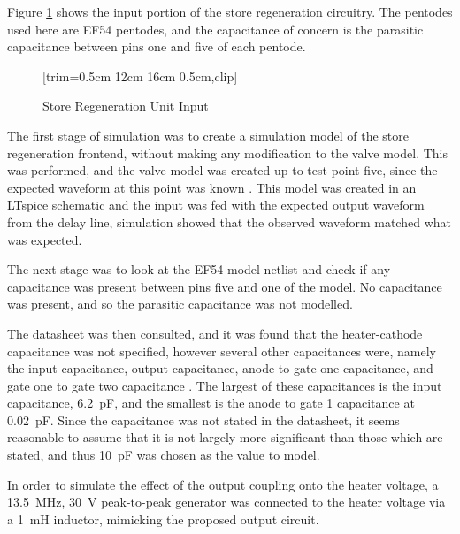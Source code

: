 Figure \ref{fig:store-regen-input} shows the input portion of the store regeneration circuitry. The pentodes used here are EF54 pentodes, and the capacitance of concern is the parasitic capacitance between pins one and five of each pentode.

\begin{figure}[ht]
	\centering
	[trim={0.5cm 12cm 16cm 0.5cm},clip] %
	\caption{Store Regeneration Unit Input \cite{burton2014b}}
	\label{fig:store-regen-input}
\end{figure}

The first stage of simulation was to create a simulation model of the store regeneration frontend, without making any modification to the valve model. This was performed, and the valve model was created up to test point five, since the expected waveform at this point was known \cite[p.3]{linnington2016b}. This model was created in an LTspice schematic and the input was fed with the expected output waveform from the delay line, simulation showed that the observed waveform matched what was expected.

The next stage was to look at the EF54 model netlist and check if any capacitance was present between pins five and one of the model. No capacitance was present, and so the parasitic capacitance was not modelled.

The datasheet was then consulted, and it was found that the heater-cathode capacitance was not specified, however several other capacitances were, namely the input capacitance, output capacitance, anode to gate one capacitance, and gate one to gate two capacitance \cite{mullardb}. The largest of these capacitances is the input capacitance, \SI{6.2}{\pico\farad}, and the smallest is the anode to gate 1 capacitance at \SI{0.02}{\pico\farad}. Since the capacitance was not stated in the datasheet, it seems reasonable to assume that it is not largely more significant than those which are stated, and thus \SI{10}{\pico\farad} was chosen as the value to model.

In order to simulate the effect of the output coupling onto the heater voltage, a \SI{13.5}{\mega\hertz}, \SI{30}{\volt} peak-to-peak generator was connected to the heater voltage via a \SI{1}{\milli\henry} inductor, mimicking the proposed output circuit.



